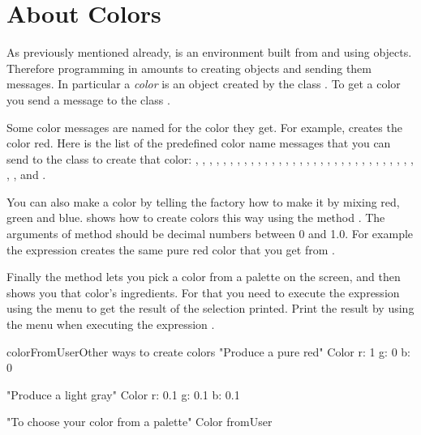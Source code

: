 \section{About Colors}

As previously mentioned already, \sq  is an environment built from and using objects. Therefore programming in \sq amounts to creating objects and sending them messages. In particular a \emph{color} is an object created by the class . To get a color you  send a message to the class . 


Some color messages are named for the color they get. For example,  creates the color red. Here is the list of the predefined color name messages that you can send  to the class  to create that color: 
, , , , , , , , , , , , , , , , , , , , , , , , , , , , , , , , , , and .

You can also make a color by telling the  factory how to make it by mixing red, green and blue.   shows how to create colors this way using the method . 
 The arguments of method  should be decimal numbers between 0 and 1.0. For example the expression  creates the same pure red color that you get from . 
 
 Finally the method  
 lets you pick a color from a palette on the screen, and then shows you that color's ingredients. For that you need to execute the expression  using the  menu to get the result of the selection printed. Print the result by using the  menu when executing the expression .

\begin{scriptfig}{colorFromUser}{Other ways to create colors}\label{scr:colorCreation}
"Produce a pure red"
Color r: 1 g: 0 b: 0

"Produce a light gray"
Color r: 0.1 g: 0.1 b: 0.1

"To choose your color from a palette"
Color fromUser
\end{scriptfig}



